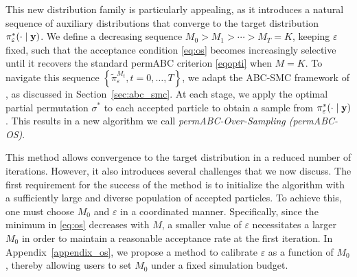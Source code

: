 
This new distribution family is particularly appealing, as it introduces a natural sequence of auxiliary distributions that converge to the target distribution \( \pi_\varepsilon^*(\cdot \mid \mathbf{y}) \). We define a decreasing sequence \( M_0 > M_1 > \cdots > M_T = K \), keeping \( \varepsilon \) fixed, such that the acceptance condition \eqref{eq:os} becomes increasingly selective until it recovers the standard permABC criterion \eqref{eqopti} when \( M = K \). 
To navigate this sequence \( \left \{\tilde{\pi}_\varepsilon^{M_t}, t = 0, \dots, T \right\} \), we adapt the ABC-SMC framework of \citet{delmoralAdaptiveSequentialMonte2012}, as discussed in Section~\ref{sec:abc_smc}. At each stage, we apply the optimal partial permutation \( \sigma^* \) to each accepted particle to obtain a sample from \( \pi_\varepsilon^*(\cdot \mid \mathbf{y}) \). This results in a new algorithm we call \emph{permABC-Over-Sampling (permABC-OS)}.

This method allows convergence to the target distribution in a reduced number of iterations. However, it also introduces several challenges that we now discuss. The first requirement for the success of the method is to initialize the algorithm with a sufficiently large and diverse population of accepted particles. To achieve this, one must choose $M_0$ and $\varepsilon$ in a coordinated manner. Specifically, since the minimum in \eqref{eq:os} decreases with $M$, a smaller value of $\varepsilon$ necessitates a larger $M_0$ in order to maintain a reasonable acceptance rate at the first iteration. In Appendix~\ref{appendix_os}, we propose a method to calibrate $\varepsilon$ as a function of $M_0$, thereby allowing users to set $M_0$ under a fixed simulation budget.

